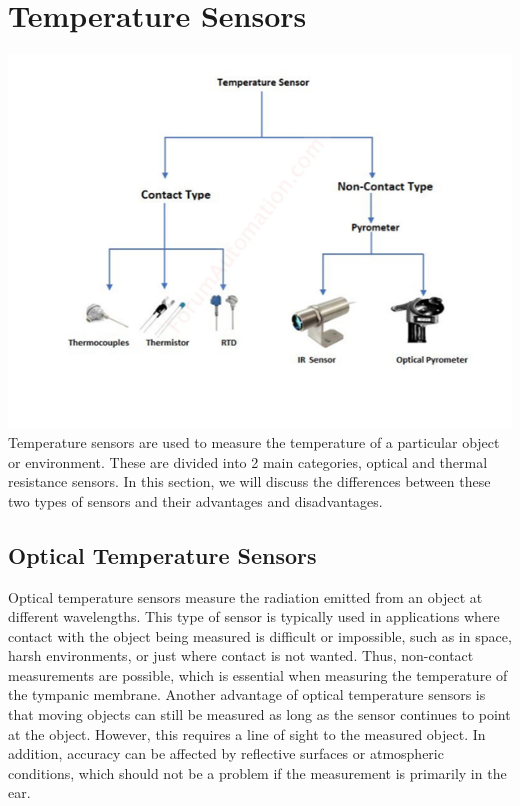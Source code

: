 \section{Temperature Sensors}
\includegraphics[scale=0.7]{thesis-doc/images/introduction/temp_sensor_types.png}
Temperature sensors are used to measure the temperature of a particular object or environment.
These are divided into 2 main categories, optical and thermal resistance sensors.
In this section, we will discuss the differences between these two types of sensors and their advantages and disadvantages.


\subsection{Optical Temperature Sensors}
Optical temperature sensors measure the radiation emitted from an object at different wavelengths. 
This type of sensor is typically used in applications where contact with the object being measured is difficult or impossible, such as in space, harsh environments, or just where contact is not wanted.
Thus, non-contact measurements are possible, which is essential when measuring the temperature of the tympanic membrane.
Another advantage of optical temperature sensors is that moving objects can still be measured as long as the sensor continues to point at the object.
However, this requires a line of sight to the measured object.
In addition, accuracy can be affected by reflective surfaces or atmospheric conditions, which should not be a problem if the measurement is primarily in the ear.

